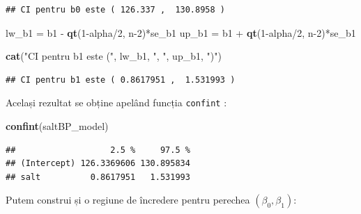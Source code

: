 \documentclass[]{article}
\newenvironment{Shaded}{\begin{snugshade}}{\end{snugshade}}
\newcommand{\KeywordTok}[1]{\textcolor[rgb]{0.13,0.29,0.53}{\textbf{{#1}}}}
\newcommand{\DecValTok}[1]{\textcolor[rgb]{0.00,0.00,0.81}{{#1}}}
\newcommand{\StringTok}[1]{\textcolor[rgb]{0.31,0.60,0.02}{{#1}}}
\newcommand{\NormalTok}[1]{{#1}}
\begin{document}
\begin{verbatim}
## CI pentru b0 este ( 126.337 ,  130.8958 )
\end{verbatim}

\begin{Shaded}
\begin{Highlighting}[]
\NormalTok{lw_b1 =}\StringTok{ }\NormalTok{b1 -}\StringTok{ }\KeywordTok{qt}\NormalTok{(}\DecValTok{1}\NormalTok{-alpha/}\DecValTok{2}\NormalTok{, n}\DecValTok{-2}\NormalTok{)*se_b1}
\NormalTok{up_b1 =}\StringTok{ }\NormalTok{b1 +}\StringTok{ }\KeywordTok{qt}\NormalTok{(}\DecValTok{1}\NormalTok{-alpha/}\DecValTok{2}\NormalTok{, n}\DecValTok{-2}\NormalTok{)*se_b1}
  
\KeywordTok{cat}\NormalTok{(}\StringTok{"CI pentru b1 este ("}\NormalTok{, lw_b1, }\StringTok{", "}\NormalTok{, up_b1, }\StringTok{")"}\NormalTok{)}
\end{Highlighting}
\end{Shaded}

\begin{verbatim}
## CI pentru b1 este ( 0.8617951 ,  1.531993 )
\end{verbatim}

Același rezultat se obține apelând funcția \texttt{confint} :

\begin{Shaded}
\begin{Highlighting}[]
\KeywordTok{confint}\NormalTok{(saltBP_model)}
\end{Highlighting}
\end{Shaded}

\begin{verbatim}
##                   2.5 %     97.5 %
## (Intercept) 126.3369606 130.895834
## salt          0.8617951   1.531993
\end{verbatim}

Putem construi și o regiune de încredere pentru perechea
\((\beta_0, \beta_1)\):
\end{document}
